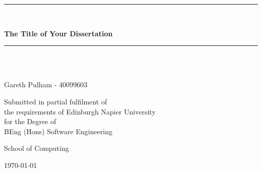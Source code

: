 \documentclass[12pt,a4paper]{article}
\begin{document}
\newcommand{\HRule}{\rule{\linewidth}{0.5mm}}
\begin{titlepage}
        \begin{center}

        \HRule \\[0.4cm]
        {\Large \bfseries The Title of Your Dissertation\par} %
        \vspace{0.2cm}
        \HRule \\[1.5cm]

        \vspace{3cm}
        \begin{minipage}{0.4\textwidth}
        \begin{center} \large
        \emph{}\\
                Gareth Pulham - 40099603
        \end{center}
        \end{minipage}
        
        \vspace{2cm}
        \begin{minipage}{1\textwidth}
        \begin{center} \large
                Submitted in partial fulfilment of \\
                the requirements of Edinburgh Napier University \\
                for the Degree of \\
                BEng (Hons) Software Engineering
        \end{center}
        \end{minipage}

        \vfill

        \begin{minipage}{1\textwidth}
        \begin{center} \large
                School of Computing
        \end{center}
        \end{minipage}
        
        \vspace{1cm}
        {\large \today}


        \end{center}
\end{titlepage}
\end{document}
